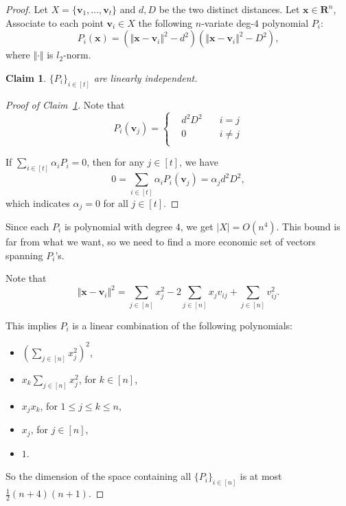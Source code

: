 \documentclass{article}
\newtheorem{claim}[theorem]{Claim}
\theoremstyle{definition}
\begin{document}
\begin{proof}
    Let $X=\{ \boldsymbol{v}_{1},\ldots,\boldsymbol{v}_{t} \}$ and $d,D$ be the two distinct distances. Let $\boldsymbol{x}\in \mathbf{R}^{n}$, Associate to each point $\boldsymbol{v}_{i}\in X$ the following $n$-variate deg-$4$ polynomial $P_{i}$:
    $$P_{i}(\boldsymbol{x})=(\Vert \boldsymbol{x}-\boldsymbol{v}_{i} \Vert^{2}-d^{2})(\Vert \boldsymbol{x}-\boldsymbol{v}_{i} \Vert^{2}-D^{2}),$$
    where $\Vert \cdot \Vert$ is $l_{2}$-norm.

    \begin{claim}\label{pi linearly independent}
        $\{ P_{i} \}_{i\in [t]}$ are linearly independent.
    \end{claim}
    \begin{proof}[Proof of Claim~\ref{pi linearly independent}]
        Note that
        $$P_{i}(\boldsymbol{v}_{j})=\left\{
    	\begin{aligned}
    	&d^{2}D^{2} \quad &i=j\\
    	&0 \quad &i\neq j\\
    	\end{aligned}
    	\right
    	.
        $$

        If $\sum_{i\in [t]}\alpha_{i}P_{i}=0$, then for any $j\in [t]$, we have
        $$0=\sum_{i\in [t]}\alpha_{i}P_{i}(\boldsymbol{v}_{j})=\alpha_{j}d^{2}D^{2},$$
        which indicates $\alpha_{j}=0$ for all $j\in [t]$.
    \end{proof}

    Since each $P_{i}$ is polynomial with degree $4$, we get $|X|=O(n^{4})$. This bound is far from what we want, so we need to find a more economic set of vectors spanning $P_{i}$'s.

    Note that
    $$\Vert \boldsymbol{x}-\boldsymbol{v}_{i} \Vert^{2}=\sum_{j\in [n]} x_{j}^{2}-2\sum_{j\in[n]}x_{j}v_{ij}+\sum_{j\in [n]}v_{ij}^{2}.$$

    This implies $P_{i}$ is a linear combination of the following polynomials:
    
    \begin{itemize}
        \item $(\sum_{j\in [n]} x_{j}^{2})^{2}$,
        \item $x_{k}\sum_{j\in [n]}x_{j}^{2}$, for $k\in [n]$,
        \item $x_{j}x_{k}$, for $1\leq j\leq k\leq n$,
        \item $x_{j}$, for $j\in [n]$,
        \item $1$.
    \end{itemize}

    So the dimension of the space containing all $\{ P_{i} \}_{i\in [n]}$ is at most $\frac{1}{2}(n+4)(n+1)$.
\end{proof}
\end{document}
